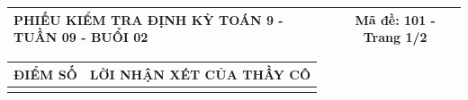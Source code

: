 \documentclass[12pt,a4paper]{article}
\begin{document}
\pagestyle{empty}
\noindent
\begin{tabularx}{\linewidth}{|X|c|}
\hline
\textbf{PHIẾU KIỂM TRA ĐỊNH KỲ TOÁN 9 - TUẦN 09 - BUỔI 02} & \textbf{Mã đề: 101 - Trang 1/2} \\
\hline
\end{tabularx}

\vspace{1.0mm}

\noindent
\begin{tabularx}{\linewidth}{|p{3.2cm}|X|}
\hline
\centering\textbf{ĐIỂM SỐ} & \centering\textbf{LỜI NHẬN XÉT CỦA THẦY CÔ} \tabularnewline
\hline
\rule{0pt}{1.8cm} & \tabularnewline
\hline
\end{tabularx}
\end{document}
